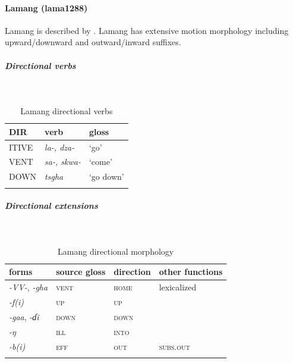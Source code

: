 \paragraph*{Lamang (lama1288)} \label{lama}

Lamang is described by \citet{wolffGrammarLamangLanguage1983,wolffEncodingTopographyDirection2006,wolffLamangLanguageDictionary2015}. Lamang has extensive motion morphology including upward{\slash}downward and outward{\slash}inward suffixes.

\subparagraph*{\textbf{Directional verbs}}
~
\begin{table}[H]
	\caption{Lamang directional verbs} 
	\label{tab:lamaV}
	\begin{tabular}{lll} %
		\lsptoprule
		DIR & verb & gloss   \\ %
		\midrule
		ITIVE & \textit{la-, dza-} & `go' \\
		VENT & \textit{sa-, skwa-} & `come' \\
		DOWN & \textit{tsgha} & `go down' \\
		\lspbottomrule
	\end{tabular}
\end{table}

\subparagraph{Directional extensions}~

\begin{table}[H]
	\caption{Lamang directional morphology}
	\label{tab:lamang}
	\begin{tabular}{llll} %
		\lsptoprule
		forms & source gloss & direction  & other functions  \\ %
		\midrule
		\textit{-VV-}, \textit{-gha}  &  \textsc{vent}  & \textsc{home} &  lexicalized \\
		\textit{-f(i)}  &  \textsc{up}  &     \textsc{up} &   \\
		\textit{-gaa}, \textit{-ɗi}  &  \textsc{down}    & \textsc{down} &   \\
		\textit{-ŋ}  &  \textsc{ill}  &  \textsc{into}   &  \\
		\textit{-b(i)}  &  \textsc{eff}  &   \textsc{out} &   \textsc{subs.out} \\
		\lspbottomrule
	\end{tabular}
\end{table}

